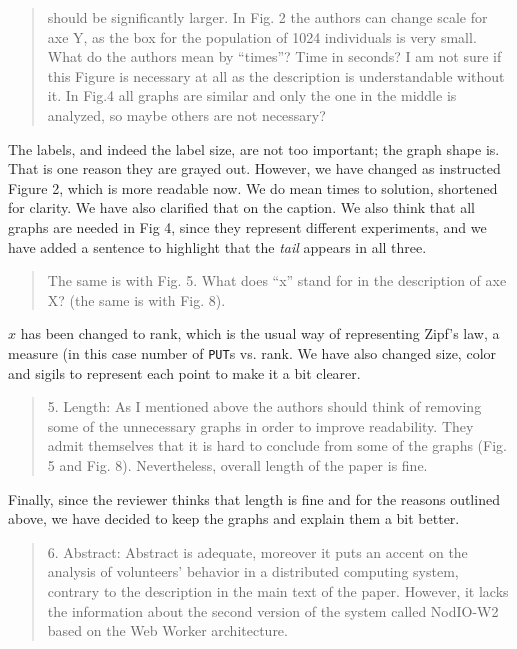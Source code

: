 \documentclass[preprint]{elsarticle}
\begin{document}
\begin{quote}
should be significantly larger. In Fig. 2 the authors can change scale
for axe Y, as the box for the population of 1024 individuals is very
small.  What do the authors mean by ``times''? Time in seconds? I am not
sure if this Figure is necessary at all as the description is
understandable without it. In Fig.4 all graphs are similar and only
the one in the middle is analyzed, so maybe others are not necessary?
\end{quote}

The labels, and indeed the label size, are not too important; the
graph shape is. That is one reason they are grayed out. However, we
have changed as instructed Figure 2, which is more readable now. We do
mean times to solution, shortened for clarity. We have also clarified
that on the caption. We also think that all graphs are needed in Fig
4, since they represent different experiments, and we have added a
sentence to highlight that the {\em tail} appears in all three. 

\begin{quote}
The same is with Fig. 5. What does ``x'' stand for in the description of
axe X? (the same is with Fig. 8).
\end{quote}

$x$ has been changed to {\sf rank}, which is the usual way of
representing Zipf's law, a measure (in this case number of {\tt PUT}s
vs. rank. We have also changed size, color and sigils to represent
each point to make it a bit clearer. 

\begin{quote}

5. Length: As I mentioned above the authors should think of removing some of the unnecessary graphs
in order to improve readability. They admit themselves that it is hard to conclude from some of the
graphs (Fig. 5 and Fig. 8). Nevertheless, overall length of the paper is fine.

\end{quote}

Finally, since the reviewer thinks that length is fine and for the
reasons outlined above, we have decided to keep the graphs and explain
them a bit better.

\begin{quote}
6. Abstract: Abstract is adequate, moreover it puts an accent on the analysis of volunteers' behavior in a
distributed computing system, contrary to the description in the main text of the paper. However, it
lacks the information about the second version of the system called NodIO-W2 based on the Web
Worker architecture.
\end{quote}
\end{document}
